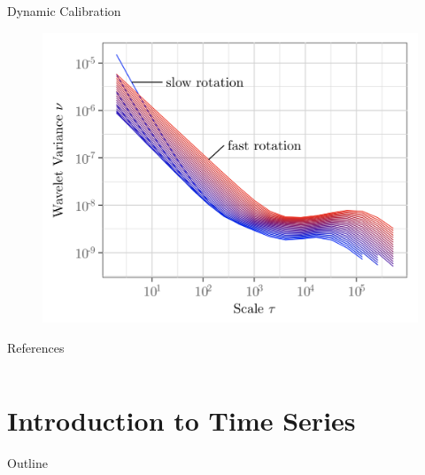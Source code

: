 \documentclass[envcountsect,usenames,dvipsnames]{beamer}
\theoremstyle{mystyle}
\begin{document}
\begin{frame}{Dynamic Calibration}
    \begin{figure}
        \centering
        \includegraphics[scale = 0.40]{Images/pilou2.png}
    \end{figure}
\end{frame}



\begin{frame}{References}
\begin{columns}
\column{0.85\paperwidth}
\printbibliography[section=1, heading = Ref]
\end{columns}
\end{frame}

\section{Introduction to Time Series}\newrefsection

\begin{frame}{Outline}
\small
\begin{multicols}{2}
  \tableofcontents[currentsection]
\end{multicols}
\end{frame}






\end{document}
